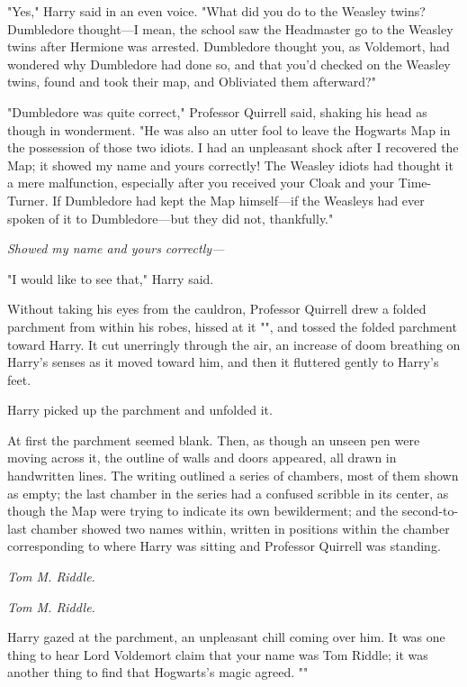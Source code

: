 "Yes," Harry said in an even voice. "What did you do to the Weasley twins? 
Dumbledore thought---I mean, the school saw the Headmaster go to the Weasley 
twins after Hermione was arrested. Dumbledore thought you, as Voldemort, had 
wondered why Dumbledore had done so, and that you'd checked on the Weasley 
twins, found and took their map, and Obliviated them afterward?"

"Dumbledore was quite correct," Professor Quirrell said, shaking his head as 
though in wonderment. "He was also an utter fool to leave the Hogwarts Map in 
the possession of those two idiots. I had an unpleasant shock after I recovered 
the Map; it showed my name and yours correctly! The Weasley idiots had thought 
it a mere malfunction, especially after you received your Cloak and your 
Time-Turner. If Dumbledore had kept the Map himself---if the Weasleys had ever 
spoken of it to Dumbledore---but they did not, thankfully."

\emph{Showed my name and yours correctly---}

"I would like to see that," Harry said.

Without taking his eyes from the cauldron, Professor Quirrell drew a folded 
parchment from within his robes, hissed at it "", and tossed the folded parchment toward Harry. It cut 
unerringly through the air, an increase of doom breathing on Harry's senses as 
it moved toward him, and then it fluttered gently to Harry's feet.

Harry picked up the parchment and unfolded it.

At first the parchment seemed blank. Then, as though an unseen pen were moving 
across it, the outline of walls and doors appeared, all drawn in handwritten 
lines. The writing outlined a series of chambers, most of them shown as empty; 
the last chamber in the series had a confused scribble in its center, as though 
the Map were trying to indicate its own bewilderment; and the second-to-last 
chamber showed two names within, written in positions within the chamber 
corresponding to where Harry was sitting and Professor Quirrell was standing.

\emph{Tom M. Riddle.}

\emph{Tom M. Riddle.}

Harry gazed at the parchment, an unpleasant chill coming over him. It was one 
thing to hear Lord Voldemort claim that your name was Tom Riddle; it was 
another thing to find that Hogwarts's magic agreed. ""

